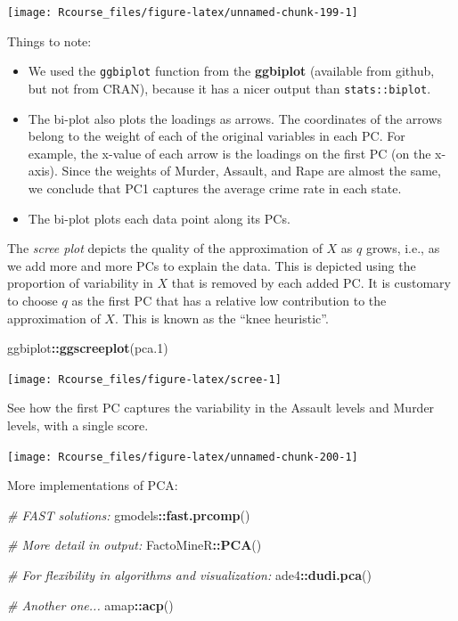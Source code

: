 \documentclass[]{book}
\newenvironment{Shaded}{\begin{snugshade}}{\end{snugshade}}
\newcommand{\KeywordTok}[1]{\textcolor[rgb]{0.13,0.29,0.53}{\textbf{#1}}}
\newcommand{\DecValTok}[1]{\textcolor[rgb]{0.00,0.00,0.81}{#1}}
\newcommand{\CommentTok}[1]{\textcolor[rgb]{0.56,0.35,0.01}{\textit{#1}}}
\newcommand{\OperatorTok}[1]{\textcolor[rgb]{0.81,0.36,0.00}{\textbf{#1}}}
\newcommand{\NormalTok}[1]{#1}
\providecommand{\tightlist}{%
  \setlength{\itemsep}{0pt}\setlength{\parskip}{0pt}}
\theoremstyle{definition}
\theoremstyle{definition}
\theoremstyle{definition}
\theoremstyle{remark}
\begin{document}
\texttt{[image: Rcourse\_files/figure-latex/unnamed-chunk-199-1]}

Things to note:

\begin{itemize}
\tightlist
\item
  We used the \texttt{ggbiplot} function from the \textbf{ggbiplot}
  (available from github, but not from CRAN), because it has a nicer
  output than \texttt{stats::biplot}.
\item
  The bi-plot also plots the loadings as arrows. The coordinates of the
  arrows belong to the weight of each of the original variables in each
  PC. For example, the x-value of each arrow is the loadings on the
  first PC (on the x-axis). Since the weights of Murder, Assault, and
  Rape are almost the same, we conclude that PC1 captures the average
  crime rate in each state.
\item
  The bi-plot plots each data point along its PCs.
\end{itemize}

The \emph{scree plot} depicts the quality of the approximation of \(X\)
as \(q\) grows, i.e., as we add more and more PCs to explain the data.
This is depicted using the proportion of variability in \(X\) that is
removed by each added PC. It is customary to choose \(q\) as the first
PC that has a relative low contribution to the approximation of \(X\).
This is known as the ``knee heuristic''.

\begin{Shaded}
\begin{Highlighting}[]
\NormalTok{ggbiplot}\OperatorTok{::}\KeywordTok{ggscreeplot}\NormalTok{(pca.}\DecValTok{1}\NormalTok{)}
\end{Highlighting}
\end{Shaded}

\texttt{[image: Rcourse\_files/figure-latex/scree-1]}

See how the first PC captures the variability in the Assault levels and
Murder levels, with a single score.

\texttt{[image: Rcourse\_files/figure-latex/unnamed-chunk-200-1]}

More implementations of PCA:

\begin{Shaded}
\begin{Highlighting}[]
\CommentTok{# FAST solutions:}
\NormalTok{gmodels}\OperatorTok{::}\KeywordTok{fast.prcomp}\NormalTok{()}

\CommentTok{# More detail in output:}
\NormalTok{FactoMineR}\OperatorTok{::}\KeywordTok{PCA}\NormalTok{()}

\CommentTok{# For flexibility in algorithms and visualization:}
\NormalTok{ade4}\OperatorTok{::}\KeywordTok{dudi.pca}\NormalTok{()}

\CommentTok{# Another one...}
\NormalTok{amap}\OperatorTok{::}\KeywordTok{acp}\NormalTok{()}
\end{Highlighting}
\end{Shaded}
\end{document}
